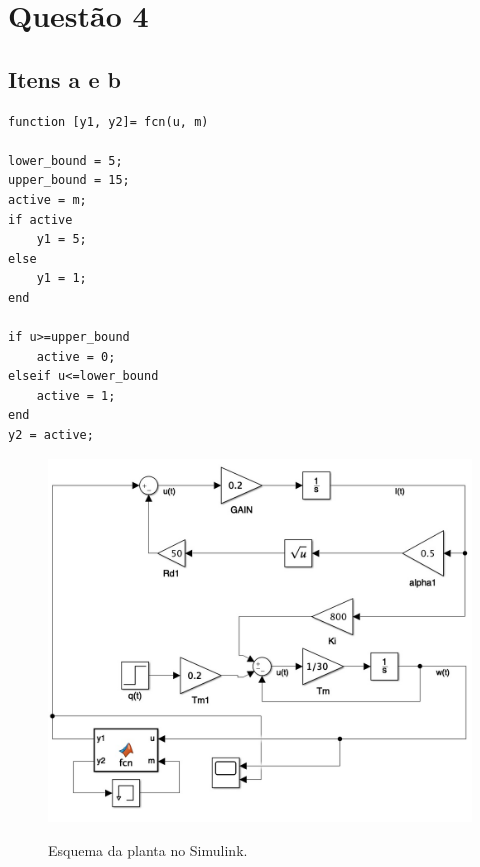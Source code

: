 \documentclass[11pt]{article}
\begin{document}
\section{Questão 4}
\subsection{Itens a e b}
\begin{lstlisting}[caption={Código usado para controlar a planta},captionpos=b]
function [y1, y2]= fcn(u, m)

lower_bound = 5;
upper_bound = 15;
active = m;
if active
    y1 = 5;
else
    y1 = 1;
end

if u>=upper_bound
    active = 0;
elseif u<=lower_bound
    active = 1;
end
y2 = active;
\end{lstlisting}

\begin{figure}[H]
	\centering
	{\includegraphics[width=\textwidth]
		{assets/q4_ab_control_schema.jpg}}
	\caption{Esquema da planta no Simulink.}
\end{figure}
\end{document}

